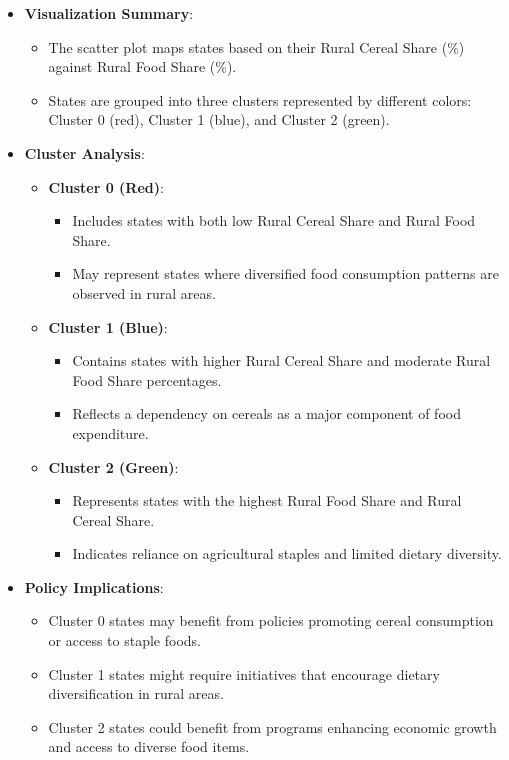 \documentclass{article}
\begin{document}
\begin{itemize}
	\item \textbf{Visualization Summary}:
	\begin{itemize}
		\item The scatter plot maps states based on their Rural Cereal Share (\%) against Rural Food Share (\%).
		\item States are grouped into three clusters represented by different colors: Cluster 0 (red), Cluster 1 (blue), and Cluster 2 (green).
	\end{itemize}
	\item \textbf{Cluster Analysis}:
	\begin{itemize}
		\item \textbf{Cluster 0 (Red)}:
		\begin{itemize}
			\item Includes states with both low Rural Cereal Share and Rural Food Share.
			\item May represent states where diversified food consumption patterns are observed in rural areas.
		\end{itemize}
		\item \textbf{Cluster 1 (Blue)}:
		\begin{itemize}
			\item Contains states with higher Rural Cereal Share and moderate Rural Food Share percentages.
			\item Reflects a dependency on cereals as a major component of food expenditure.
		\end{itemize}
		\item \textbf{Cluster 2 (Green)}:
		\begin{itemize}
			\item Represents states with the highest Rural Food Share and Rural Cereal Share.
			\item Indicates reliance on agricultural staples and limited dietary diversity.
		\end{itemize}
	\end{itemize}
	\item \textbf{Policy Implications}:
	\begin{itemize}
		\item Cluster 0 states may benefit from policies promoting cereal consumption or access to staple foods.
		\item Cluster 1 states might require initiatives that encourage dietary diversification in rural areas.
		\item Cluster 2 states could benefit from programs enhancing economic growth and access to diverse food items.
	\end{itemize}
\end{itemize}
\end{document}
